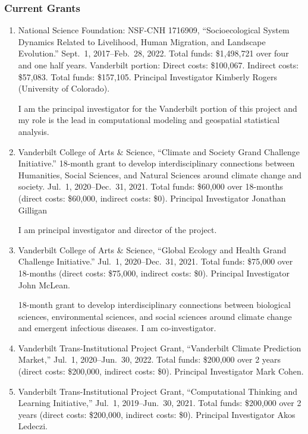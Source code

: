 %
%
\subsubsection{Current Grants}
\begin{enumerate}
    \item National Science Foundation: NSF-CNH 1716909,
    ``Socioecological System Dynamics Related to Livelihood, Human Migration, and Landscape Evolution.''
    Sept.~1, 2017--Feb.~28, 2022.
    Total funds: \$1,498,721 over four and one half years. Vanderbilt portion: Direct costs: \$100,067. Indirect costs: \$57,083. Total funds: \$157,105.
    Principal Investigator Kimberly Rogers (University of Colorado).
\begin{credit}
I am the principal investigator for the Vanderbilt portion of this project and my role is the lead in computational modeling and geospatial statistical analysis.
\end{credit}
    \item Vanderbilt College of Arts \& Science,
    ``Climate and Society Grand Challenge Initiative.''
    18-month grant to develop interdisciplinary connections between Humanities, Social Sciences, and Natural Sciences around climate change and society.
    Jul.~1, 2020--Dec.~31, 2021.
    Total funds: \$60,000 over 18-months (direct costs: \$60,000, indirect costs: \$0).
    Principal Investigator Jonathan Gilligan
\begin{credit}
I am principal investigator and director of the project.
\end{credit}
    \item Vanderbilt College of Arts \& Science,
    ``Global Ecology and Health Grand Challenge Initiative.''
    Jul.~1, 2020--Dec.~31, 2021.
    Total funds: \$75,000 over 18-months (direct costs: \$75,000, indirect costs: \$0).
    Principal Investigator John McLean.
\begin{credit}
18-month grant to develop interdisciplinary connections between biological sciences, environmental sciences, and social sciences around climate change and emergent infectious diseases.
I am co-investigator.
\end{credit}
    \item Vanderbilt Trans-Institutional Project Grant,
    ``Vanderbilt Climate Prediction Market,''
    Jul.~1, 2020--Jun.~30, 2022.
    Total funds: \$200,000 over 2 years (direct costs: \$200,000, indirect costs: \$0).
    Principal Investigator Mark Cohen.
    \item Vanderbilt Trans-Institutional Project Grant,
    ``Computational Thinking and Learning Initiative,''
    Jul.~1, 2019--Jun.~30, 2021.
    Total funds: \$200,000 over 2 years (direct costs: \$200,000, indirect costs: \$0).
    Principal Investigator Akos Ledeczi.
\end{enumerate}
%
\iffalse
